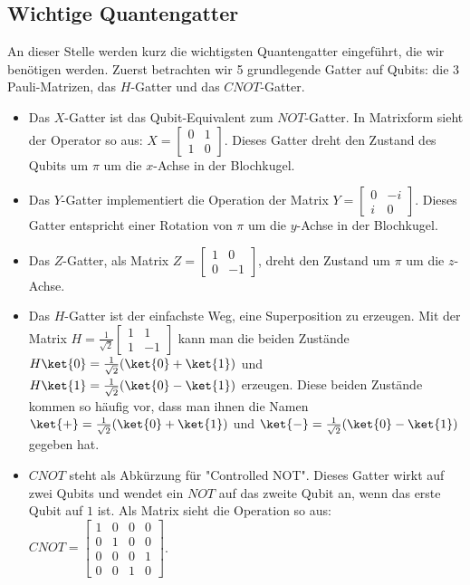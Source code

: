 \subsection{Wichtige Quantengatter}
An dieser Stelle werden kurz die wichtigsten Quantengatter eingeführt, die wir benötigen werden. Zuerst betrachten wir 5 grundlegende Gatter auf Qubits: die 3 Pauli-Matrizen, das $H$-Gatter und das $CNOT$-Gatter.
\begin{itemize}
    \item Das $X$-Gatter ist das Qubit-Equivalent zum $NOT$-Gatter. In Matrixform sieht der Operator so aus: $ X = \begin{bmatrix}0 & 1 \\ 1 & 0\end{bmatrix}$. Dieses Gatter dreht den Zustand des Qubits um $\pi$ um die $x$-Achse in der Blochkugel.
    \item Das $Y$-Gatter implementiert die Operation der Matrix $Y = \begin{bmatrix}0 & -i \\ i & 0\end{bmatrix}$. Dieses Gatter entspricht einer Rotation von $\pi$ um die $y$-Achse in der Blochkugel.
    \item Das $Z$-Gatter, als Matrix $Z = \begin{bmatrix}1 & 0 \\ 0 & -1\end{bmatrix}$, dreht den Zustand um $\pi$ um die $z$-Achse.
    \item Das $H$-Gatter ist der einfachste Weg, eine Superposition zu erzeugen. Mit der Matrix $H = \frac{1}{\sqrt{2}}\begin{bmatrix}1 & 1 \\ 1 & -1\end{bmatrix}$ kann man die beiden Zustände $H\ket{0} = \frac{1}{\sqrt{2}}(\ket{0} + \ket{1})$ und $H\ket{1} = \frac{1}{\sqrt{2}}(\ket{0} - \ket{1})$ erzeugen. Diese beiden Zustände kommen so häufig vor, dass man ihnen die Namen $\ket{+} = \frac{1}{\sqrt{2}}(\ket{0} + \ket{1})$ und $\ket{-} = \frac{1}{\sqrt{2}}(\ket{0} - \ket{1})$ gegeben hat.
    \item $CNOT$ steht als Abkürzung für "Controlled NOT". Dieses Gatter wirkt auf zwei Qubits und wendet ein $NOT$ auf das zweite Qubit an, wenn das erste Qubit auf $1$ ist. Als Matrix sieht die Operation so aus: $CNOT = \begin{bmatrix}1 & 0 & 0 & 0 \\ 0 & 1 & 0 & 0 \\ 0 & 0 & 0 & 1 \\ 0 & 0 & 1 & 0\end{bmatrix}$.
\end{itemize}

